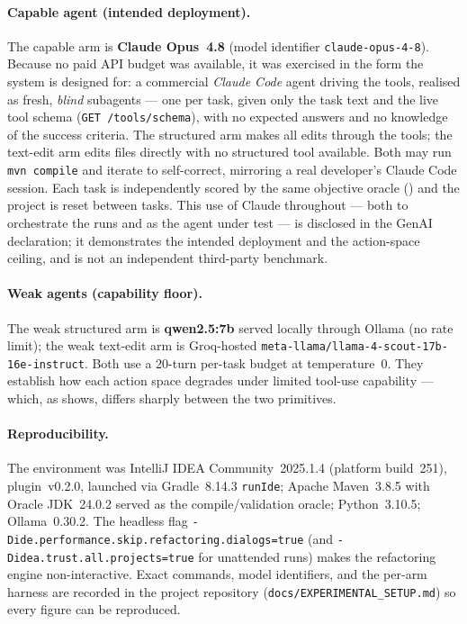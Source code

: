 \paragraph{Capable agent (intended deployment).} The capable arm is
\textbf{Claude Opus~4.8} (model identifier \texttt{claude-opus-4-8}). Because no
paid API budget was available, it was exercised in the form the system is
designed for: a commercial \emph{Claude Code} agent driving the tools, realised
as fresh, \emph{blind} subagents --- one per task, given only the task text and
the live tool schema (\texttt{GET /tools/schema}), with no expected answers and
no knowledge of the success criteria. The structured arm makes all edits through
the tools; the text-edit arm edits files directly with no structured tool
available. Both may run \texttt{mvn compile} and iterate to self-correct,
mirroring a real developer's Claude Code session. Each task is independently
scored by the same objective oracle () and the project
is reset between tasks. This use of Claude throughout --- both to orchestrate the
runs and as the agent under test --- is disclosed in the GenAI declaration; it
demonstrates the intended deployment and the action-space ceiling, and is not an
independent third-party benchmark.

\paragraph{Weak agents (capability floor).} The weak structured arm is
\textbf{qwen2.5:7b} served locally through Ollama (no rate limit); the weak
text-edit arm is Groq-hosted \texttt{meta-llama/llama-4-scout-17b-16e-instruct}.
Both use a 20-turn per-task budget at temperature~0. They establish how each
action space degrades under limited tool-use capability --- which, as
 shows, differs sharply between the two primitives.

\paragraph{Reproducibility.} The environment was IntelliJ IDEA Community~2025.1.4
(platform build~251), plugin~v0.2.0, launched via Gradle~8.14.3
\texttt{runIde}; Apache Maven~3.8.5 with Oracle JDK~24.0.2 served as the
compile/validation oracle; Python~3.10.5; Ollama~0.30.2. The headless flag
\texttt{-Dide.performance.skip.refactoring.dialogs=true} (and
\texttt{-Didea.trust.all.projects=true} for unattended runs) makes the
refactoring engine non-interactive. Exact commands, model identifiers, and the
per-arm harness are recorded in the project repository
(\texttt{docs/EXPERIMENTAL\_SETUP.md}) so every figure can be reproduced.

